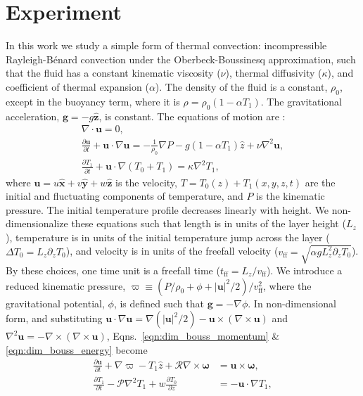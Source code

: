 \documentclass[aps, pre, onecolumn, nofootinbib, notitlepage, groupedaddress, amsfonts, amssymb, amsmath, longbibliography]{revtex4-1}
\newcommand{\DivU}{\ensuremath{\nabla\cdot\bm{u}}}
\newcommand{\grad}{\ensuremath{\nabla}}
\newcommand{\RB}{Rayleigh-B\'{e}nard }
\begin{document}
\section{Experiment}
\label{sec:experiment}
In this work we study a simple form of thermal convection:
incompressible \RB convection under the Oberbeck-Boussinesq approximation,
such that the fluid
has a constant kinematic viscosity ($\nu$), thermal diffusivity ($\kappa$), and coefficient
of thermal expansion ($\alpha$). The density of the fluid is a constant, $\rho_0$,
except in the buoyancy term, where it is $\rho = \rho_0(1  - \alpha T_1)$.
The gravitational acceleration, $\bm{g} = - g\bm{\hat{z}}$, is constant.
The equations of motion are \cite{spiegel&veronis1960}:
\begin{gather}
\DivU = 0, 
	\label{eqn:incompressible}
\\
\frac{\partial \bm{u}}{\partial t} + \bm{u}\cdot\grad\bm{u} =
-\frac{1}{\rho_0}\grad P - g( 1 - \alpha T_1)\hat{z} + \nu\grad^2\bm{u}, 
	\label{eqn:dim_bouss_momentum}
\\
\frac{\partial T_1}{\partial t} + \bm{u}\cdot\grad(T_0 + T_1) = \kappa\grad^2 T_1,
	\label{eqn:dim_bouss_energy}
\end{gather}
where $\bm{u} = u\bm{\hat{x}} + v\bm{\hat{y}} + w\bm{\hat{z}}$ is the velocity, 
$T = T_0(z) + T_1(x, y, z, t)$ are the initial and fluctuating components of temperature, 
and $P$ is the kinematic pressure. The initial temperature profile decreases
linearly with height.
We non-dimensionalize these equations such that
length is in units of the layer height ($L_z$),
temperature is in units of the initial temperature jump across the layer ($\Delta T_0 = L_z \partial_z T_0$), 
and velocity is in units of the freefall velocity ($v_{\text{ff}} = \sqrt{\alpha g L_z^2 \partial_z T_0}$).
By these choices, one time unit is a freefall time ($t_{\text{ff}} = L_z/v_{\text{ff}}$).
We introduce a reduced kinematic pressure,
$\varpi \equiv (P / \rho_0 + \phi + |\bm{u}|^2 / 2) / v_{\text{ff}}^2$, where the gravitational
potential, $\phi$, is defined such that $\bm{g} = -\grad \phi$. 
In non-dimensional form, and substituting 
$\bm{u}\cdot\grad\bm{u} = \grad(|\bm{u}|^2/2) - \bm{u}\times(\grad\times\bm{u})$
and $\grad^2\bm{u} = -\grad\times(\grad\times\bm{u})$, Eqns.~\ref{eqn:dim_bouss_momentum} \& \ref{eqn:dim_bouss_energy}
become
\begin{align}
\frac{\partial \bm{u}}{\partial t} + \grad \varpi - T_1\hat{z} + \mathcal{R}\grad\times\bm{\omega} &= \bm{u}\times\bm{\omega},
	\label{eqn:bouss_momentum}
\\
\frac{\partial T_1}{\partial t} - \mathcal{P}\grad^2 T_1 + w \frac{\partial T_0}{\partial z} &= - \bm{u}\cdot\grad T_1,
	\label{eqn:bouss_energy}
\end{align}
\end{document}

